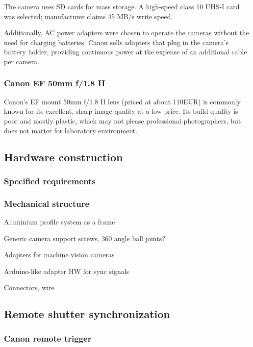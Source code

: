 The camera uses SD cards for mass storage. A high-speed class 10 UHS-I card was selected; manufacturer claims 45 MB/s write speed.

Additionally, AC power adapters were chosen to operate the cameras without the need for charging batteries.
Canon sells adapters that plug in the camera's battery holder, providing continuous power at the expense of an additional cable per camera.

\subsubsection{Canon EF 50mm f/1.8 II}

Canon's EF mount 50mm f/1.8 II lens (priced at about 110EUR) is commonly known for its excellent, sharp image quality at a low price.
Its build quality is poor and mostly plastic, which may not please professional photographers, but does not matter for laboratory environment.


\subsection{Hardware construction} %

\subsubsection{Specified requirements}

\subsubsection{Mechanical structure}

Aluminium profile system as a frame

Generic camera support screws, 360 angle ball joints?

Adapters for machine vision cameras

Arduino-like adapter HW for sync signals

Connectors, wire


\subsection{Remote shutter synchronization} %


\subsubsection{Canon remote trigger} %


